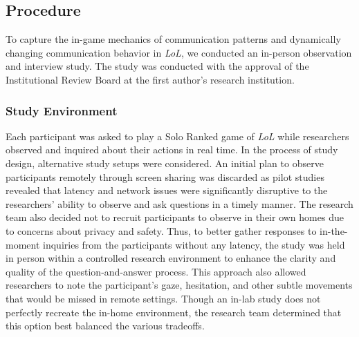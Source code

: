 \subsection{Procedure}
To capture the in-game mechanics of communication patterns and dynamically changing communication behavior in \textit{LoL}, we conducted an in-person observation and interview study. The study was conducted with the approval of the Institutional Review Board at the first author's research institution.

\subsubsection{Study Environment}

Each participant was asked to play a Solo Ranked game of \textit{LoL} while researchers observed and inquired about their actions in real time. In the process of study design, alternative study setups were considered. An initial plan to observe participants remotely through screen sharing was discarded as pilot studies revealed that latency and network issues were significantly disruptive to the researchers’ ability to observe and ask questions in a timely manner. The research team also decided not to recruit participants to observe in their own homes due to concerns about privacy and safety. Thus, to better gather responses to in-the-moment inquiries from the participants without any latency, the study was held in person within a controlled research environment to enhance the clarity and quality of the question-and-answer process. This approach also allowed researchers to note the participant's gaze, hesitation, and other subtle movements that would be missed in remote settings. Though an in-lab study does not perfectly recreate the in-home environment, the research team determined that this option best balanced the various tradeoffs.


